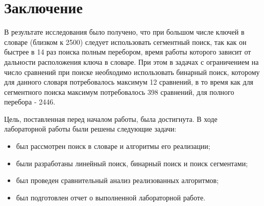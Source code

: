 \chapter*{Заключение}

В результате исследования было получено, что при большом числе ключей в словаре (близком к 2500) следует использовать сегментный поиск, так как он быстрее в 14 раз поиска полным перебором, время работы которого зависит от дальности расположения ключа в словаре. При этом в задачах с ограничением на число сравнений при поиске необходимо использовать бинарный поиск, которому для данного словаря потребовалось максимум 12 сравнений, в то время как для сегментного поиска максимум потребовалось 398 сравнений, для полного перебора - 2446.

Цель, поставленная перед началом работы, была достигнута. В ходе лабораторной работы были решены следующие задачи:

\begin{itemize}
	\item был рассмотрен поиск в словаре и алгоритмы его реализации;
	\item были разработаны линейный поиск, бинарный поиск и поиск сегментами;
	\item был проведен сравнительный анализ реализованных алгоритмов;
	\item был подготовлен отчет о выполненной лабораторной работе.
\end{itemize}
